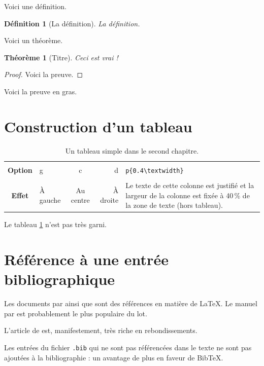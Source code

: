 \documentclass[12pt,maitrise,frenchb,natbib,twoside,initial]{dms}
\numberwithin{equation}{section}
\numberwithin{table}{chapter}
\numberwithin{figure}{chapter}
\newtheorem{deff}{Définition}[section]
\newtheorem{theo}{Théor\`eme}[section]
\begin{document}
Voici une définition.
\begin{deff}[La définition]
	La définition.
\end{deff}
Voici un théor\`eme.
\begin{theo}[Titre]
	Ceci est vrai !
\end{theo}
\begin{proof}
	Voici la preuve.
\end{proof}
\begin{demo}
	Voici la preuve en gras.
\end{demo}


\section{Construction d'un tableau}

\begin{table}[htb]
	\centering
	\caption{Un tableau simple dans le second chapitre.}
	\label{tab:simple2}
	\begin{tabular}{|c||l|c|r|p{}|}
		\hline			&			&			&			&																															\\
		\textbf{Option}	& g			& c			& d			& \verb|p{0.4\textwidth}|																									\\[3mm]
		\hline\hline	&			&			&			&																															\\
		\textbf{Effet}	& À gauche	& Au centre	& À droite	& Le texte de cette colonne est justifié et la largeur de la colonne est fixée \`a 40\,\% de la zone de texte (hors tableau).	\\[3mm]
		\hline 
	\end{tabular}
\end{table}
Le tableau \ref{tab:simple2} n'est pas tr\`es garni.

\section{Référence \`a une entrée bibliographique}

Les documents par \citet{Lamport1986,GMS1994} ainsi que \citet{Spivak1990} 
sont des références en mati\`ere de \LaTeX. Le manuel par 
\citet{GMS1994} est probablement le plus populaire du lot.

L'article de \citet{Martin1992} est, manifestement, tr\`es riche en rebondissements.

Les entrées du fichier \verb|.bib| qui ne sont pas référencées 
dans le texte ne sont pas ajoutées \`a la bibliographie : un avantage 
de plus en faveur de Bib\TeX.
\end{document}
